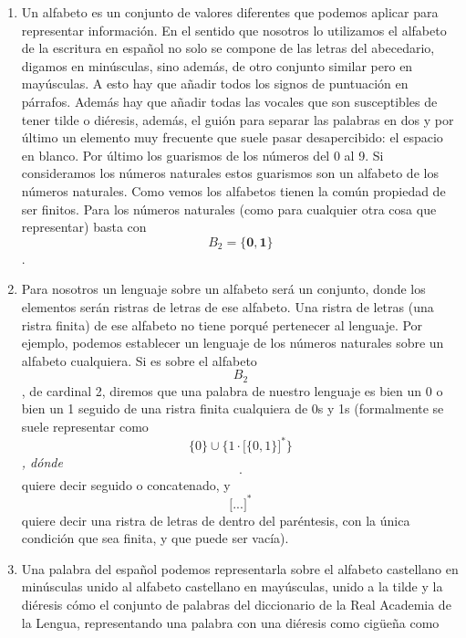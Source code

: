 \documentclass[
]{article}
\begin{document}
\begin{enumerate}
  \begin{enumerate}
  \def\labelenumii{\arabic{enumii}.}
  \item
    Un alfabeto es un conjunto de valores diferentes que podemos aplicar
    para represen\-tar información. En el sentido que nosotros lo
    utilizamos el alfabeto de la escritura en español no solo se compone
    de las letras del abecedario, digamos en minúsculas, sino además, de
    otro conjunto similar pero en mayúsculas. A esto hay que añadir
    todos los signos de puntuación en párrafos. Además hay que añadir
    todas las vocales que son susceptibles de tener tilde o diéresis,
    además, el guión para separar las palabras en dos y por último un
    elemento muy frecuente que suele pasar desapercibido: el espa\-cio
    en blanco. Por último los guarismos de los números del 0 al 9. Si
    consideramos los números naturales estos guarismos son un alfabeto
    de los números naturales. Como vemos los alfabetos tienen la común
    propiedad de ser finitos. Para los núme\-ros naturales (como para
    cualquier otra cosa que representar) basta con
    \[B_{\mathbf{\mathrm{2}}} = {\{{\mathbf{0,}\mathbf{1}}\}}\] .
  \item
    Para nosotros un lenguaje sobre un alfabeto será un conjunto, donde
    los elementos serán ristras de letras de ese alfabeto. Una ristra de
    letras (una ristra finita) de ese al\-fabeto no tiene porqué
    pertenecer al lenguaje. Por ejemplo, podemos establecer un lenguaje
    de los números naturales sobre un alfabeto cualquiera. Si es sobre
    el alfabe\-to \[B_{\mathbf{\mathrm{2}}}\], de cardinal 2, diremos
    que una palabra de nuestro lenguaje es bien un 0 o bien un 1 seguido
    de una ristra finita cualquiera de 0s y 1s (formalmente se suele
    re\-presentar como
    \[{\{ 0\}} \cup {\{{1 \cdot {\lbrack{\{ 0,1\}}\rbrack}^{\ast}}\}}\]\emph{,
    dónde \textquotesingle{}\[\cdot\]\textquotesingle{}} quiere decir
    seguido o conca\-tenado, y
    \textquotesingle\textquotesingle{}\[{\lbrack...\rbrack}^{\ast}\]\textquotesingle\textquotesingle{}
    quiere decir una ristra de letras de dentro del paréntesis, con la
    única condición que sea finita, y que puede ser vacía).
  \item
    Una palabra del español podemos representarla sobre el alfabeto
    castellano en minús\-culas unido al alfabeto castellano en
    mayúsculas, unido a la tilde y la diéresis cómo el conjunto de
    palabras del diccionario de la Real Academia de la Lengua,
    represen\-tando una palabra con una diéresis como cigüeña como

\end{enumerate}
\end{enumerate}
\end{document}

